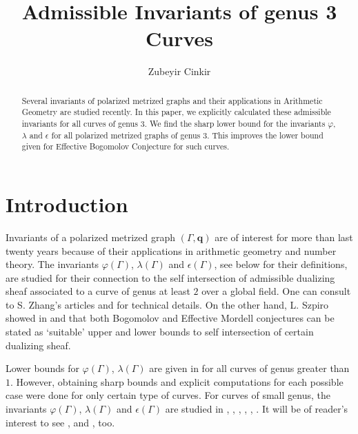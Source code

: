 \documentclass[12pt]{amsart}
\theoremstyle{example}
\theoremstyle{definition}
\theoremstyle{notation}
\begin{document}
\title[Admissible Invariants of genus 3 Curves]
{Admissible Invariants of genus 3 Curves}

\author{Zubeyir Cinkir}
\address{Zubeyir Cinkir\\
Department of Mathematics\\
Zirve University\\
27260, Gaziantep, TURKEY\\}


\begin{abstract}
Several invariants of polarized metrized graphs and their applications in Arithmetic Geometry are studied recently.
In this paper, we explicitly calculated these admissible invariants for all curves of genus $3$.
We find the sharp lower bound for the invariants $\varphi$, $\lambda$ and $\epsilon$ for all polarized metrized graphs of genus $3$.
This improves the lower bound given for Effective Bogomolov Conjecture for such curves.
\end{abstract}

\maketitle

\section{Introduction}\label{sec introduction}

Invariants of a polarized metrized graph $({\Gamma}, {\textbf{q}})$ are of interest for more than last twenty years because of their applications in arithmetic geometry and number theory. The invariants ${\varphi ({\Gamma})}$, ${\lambda ({\Gamma})}$ and ${\epsilon({\Gamma})}$, see below for their definitions, are studied for their connection to the self intersection of admissible dualizing sheaf associated to a curve of genus at least $2$ over a global field. One can consult to S. Zhang's articles \cite{Zh1} and \cite{Zh2} for technical details. On the other hand, L. Szpiro showed in \cite{LS1} and \cite{LS2} that both Bogomolov and Effective Mordell conjectures can be stated as `suitable' upper and lower bounds to self intersection of  certain dualizing  sheaf.

Lower bounds for  ${\varphi ({\Gamma})}$, ${\lambda ({\Gamma})}$ are given in \cite[Theorems 2.11 and 2.13]{C5} for all curves of genus greater than $1$. However, obtaining sharp bounds and explicit computations for each possible case were done for only certain type of curves.
For curves of small genus, the invariants ${\varphi ({\Gamma})}$, ${\lambda ({\Gamma})}$ and ${\epsilon({\Gamma})}$ are studied in \cite{AM2}, \cite{AM3}, \cite{KY1}, \cite{KY3}, \cite{J}, \cite{Fa}. It will be of reader's interest to see \cite{J2}, \cite{UK} and \cite{KY2}, too.
\end{document}
